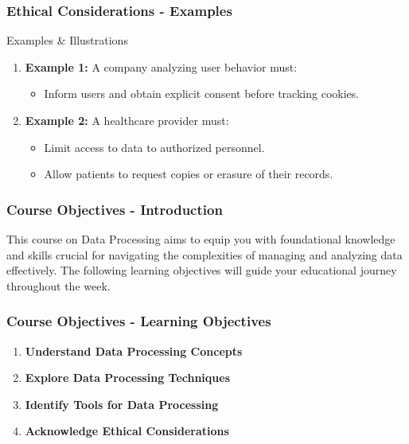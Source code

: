 \documentclass[aspectratio=169]{beamer}
\begin{document}
\begin{frame}[fragile]
    \frametitle{Ethical Considerations - Examples}
    \begin{block}{Examples & Illustrations}
        \begin{enumerate}
            \item \textbf{Example 1:} A company analyzing user behavior must:
            \begin{itemize}
                \item Inform users and obtain explicit consent before tracking cookies.
            \end{itemize}

            \item \textbf{Example 2:} A healthcare provider must:
            \begin{itemize}
                \item Limit access to data to authorized personnel.
                \item Allow patients to request copies or erasure of their records.
            \end{itemize}
        \end{enumerate}
    \end{block}
\end{frame}

\begin{frame}[fragile]
    \frametitle{Course Objectives - Introduction}
    This course on Data Processing aims to equip you with foundational knowledge and skills crucial for navigating the complexities of managing and analyzing data effectively. 
    The following learning objectives will guide your educational journey throughout the week.
\end{frame}

\begin{frame}[fragile]
    \frametitle{Course Objectives - Learning Objectives}
    \begin{enumerate}
        \item \textbf{Understand Data Processing Concepts}
        \item \textbf{Explore Data Processing Techniques}
        \item \textbf{Identify Tools for Data Processing}
        \item \textbf{Acknowledge Ethical Considerations}
    \end{enumerate}
\end{frame}
\end{document}
